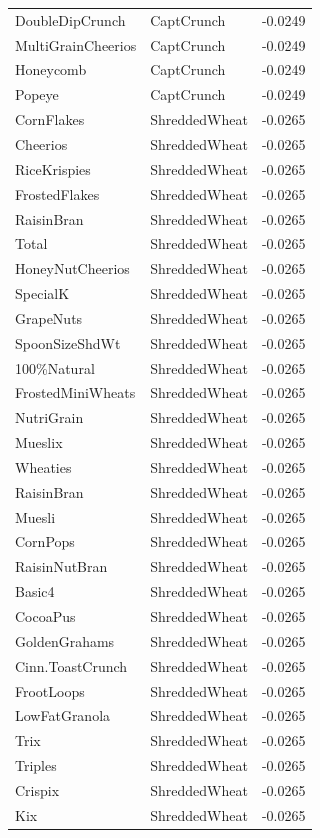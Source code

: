 \begin{table}[!htbp]
\begin{tabular}{lll}
DoubleDipCrunch & CaptCrunch & -0.0249
\\
MultiGrainCheerios & CaptCrunch & -0.0249
\\
Honeycomb & CaptCrunch & -0.0249
\\
Popeye & CaptCrunch & -0.0249
\\
CornFlakes & ShreddedWheat & -0.0265
\\
Cheerios & ShreddedWheat & -0.0265
\\
RiceKrispies & ShreddedWheat & -0.0265
\\
FrostedFlakes & ShreddedWheat & -0.0265
\\
RaisinBran & ShreddedWheat & -0.0265
\\
Total & ShreddedWheat & -0.0265
\\
HoneyNutCheerios & ShreddedWheat & -0.0265
\\
SpecialK & ShreddedWheat & -0.0265
\\
GrapeNuts & ShreddedWheat & -0.0265
\\
SpoonSizeShdWt & ShreddedWheat & -0.0265
\\
100\%Natural & ShreddedWheat & -0.0265
\\
FrostedMiniWheats & ShreddedWheat & -0.0265
\\
NutriGrain & ShreddedWheat & -0.0265
\\
Mueslix & ShreddedWheat & -0.0265
\\
Wheaties & ShreddedWheat & -0.0265
\\
RaisinBran & ShreddedWheat & -0.0265
\\
Muesli & ShreddedWheat & -0.0265
\\
CornPops & ShreddedWheat & -0.0265
\\
RaisinNutBran & ShreddedWheat & -0.0265
\\
Basic4 & ShreddedWheat & -0.0265
\\
CocoaPus & ShreddedWheat & -0.0265
\\
GoldenGrahams & ShreddedWheat & -0.0265
\\
Cinn.ToastCrunch & ShreddedWheat & -0.0265
\\
FrootLoops & ShreddedWheat & -0.0265
\\
LowFatGranola & ShreddedWheat & -0.0265
\\
Trix & ShreddedWheat & -0.0265
\\
Triples & ShreddedWheat & -0.0265
\\
Crispix & ShreddedWheat & -0.0265
\\
Kix & ShreddedWheat & -0.0265
\\

\end{tabular}
\end{table}
